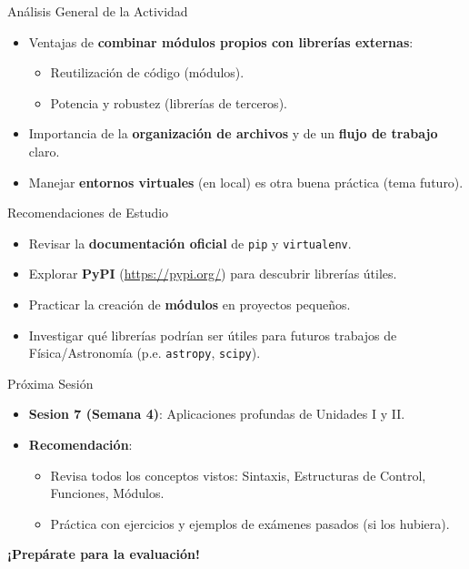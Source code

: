 \documentclass[10pt]{beamer}
\begin{document}
\begin{frame}{Análisis General de la Actividad}
  \begin{itemize}
    \item Ventajas de \textbf{combinar módulos propios con librerías externas}:
      \begin{itemize}
        \item Reutilización de código (módulos).
        \item Potencia y robustez (librerías de terceros).
      \end{itemize}
    \item Importancia de la \textbf{organización de archivos} y de un \textbf{flujo de trabajo} claro.
    \item Manejar \textbf{entornos virtuales} (en local) es otra buena práctica (tema futuro).
  \end{itemize}
\end{frame}

\begin{frame}{Recomendaciones de Estudio}
  \begin{itemize}
    \item Revisar la \textbf{documentación oficial} de \texttt{pip} y \texttt{virtualenv}.
    \item Explorar \textbf{PyPI} (\url{https://pypi.org/}) para descubrir librerías útiles.
    \item Practicar la creación de \textbf{módulos} en proyectos pequeños.
    \item Investigar qué librerías podrían ser útiles para futuros trabajos de Física/Astronomía (p.e. \texttt{astropy}, \texttt{scipy}).
  \end{itemize}
\end{frame}

\begin{frame}{Próxima Sesión}
  \begin{itemize}
    \item \textbf{Sesion 7 (Semana 4)}: Aplicaciones profundas de Unidades I y II.
    \item \textbf{Recomendación}:
      \begin{itemize}
        \item Revisa todos los conceptos vistos: Sintaxis, Estructuras de Control, Funciones, Módulos.
        \item Práctica con ejercicios y ejemplos de exámenes pasados (si los hubiera).
      \end{itemize}
  \end{itemize}
  \vspace{0.3cm}
  \textbf{¡Prepárate para la evaluación!}
\end{frame}
\end{document}
